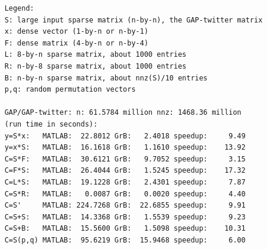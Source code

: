 {\footnotesize
\begin{verbatim}
    Legend:
    S: large input sparse matrix (n-by-n), the GAP-twitter matrix
    x: dense vector (1-by-n or n-by-1)
    F: dense matrix (4-by-n or n-by-4)
    L: 8-by-n sparse matrix, about 1000 entries
    R: n-by-8 sparse matrix, about 1000 entries
    B: n-by-n sparse matrix, about nnz(S)/10 entries
    p,q: random permutation vectors

    GAP/GAP-twitter: n: 61.5784 million nnz: 1468.36 million
    (run time in seconds):
    y=S*x:   MATLAB:  22.8012 GrB:   2.4018 speedup:     9.49
    y=x*S:   MATLAB:  16.1618 GrB:   1.1610 speedup:    13.92
    C=S*F:   MATLAB:  30.6121 GrB:   9.7052 speedup:     3.15
    C=F*S:   MATLAB:  26.4044 GrB:   1.5245 speedup:    17.32
    C=L*S:   MATLAB:  19.1228 GrB:   2.4301 speedup:     7.87
    C=S*R:   MATLAB:   0.0087 GrB:   0.0020 speedup:     4.40
    C=S'     MATLAB: 224.7268 GrB:  22.6855 speedup:     9.91
    C=S+S:   MATLAB:  14.3368 GrB:   1.5539 speedup:     9.23
    C=S+B:   MATLAB:  15.5600 GrB:   1.5098 speedup:    10.31
    C=S(p,q) MATLAB:  95.6219 GrB:  15.9468 speedup:     6.00    \end{verbatim}
}



